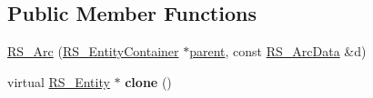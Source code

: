 \subsection*{Public Member Functions}
\begin{DoxyCompactItemize}
\item 
\hyperlink{classRS__Arc_aaca887f03b58c2ca8593f1ca2c28c954}{R\-S\-\_\-\-Arc} (\hyperlink{classRS__EntityContainer}{R\-S\-\_\-\-Entity\-Container} $\ast$\hyperlink{classRS__Entity_a80358a8d2fc6739a516a278dc500b49f}{parent}, const \hyperlink{classRS__ArcData}{R\-S\-\_\-\-Arc\-Data} \&d)
\item 
\hypertarget{classRS__Arc_a95b5043802f314eb575e40ecd7f9c826}{virtual \hyperlink{classRS__Entity}{R\-S\-\_\-\-Entity} $\ast$ {\bfseries clone} ()}\label{classRS__Arc_a95b5043802f314eb575e40ecd7f9c826}


\end{DoxyCompactItemize}
